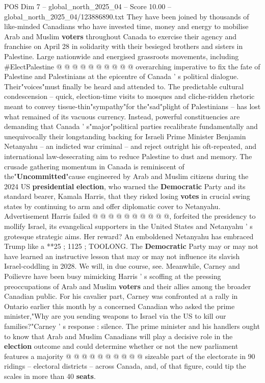 \begin{textsample}{POS Dim 7 – global\_north\_2025\_04 – Score 10.00 – global\_north\_2025\_04/123886890.txt}
They have been joined by thousands of like-minded Canadians who have invested time, money and energy to mobilise Arab and Muslim \textbf{voters} throughout Canada to exercise their agency and franchise on April 28 in solidarity with their besieged brothers and sisters in Palestine.
Large nationwide and energised grassroots movements, including \#ElectPalestine @ @ @ @ @ @ @ @ @ @ overarching imperative to fix the fate of Palestine and Palestinians at the epicentre of Canada ' s political dialogue.
Their"voices"must finally be heard and attended to.
The predictable cultural condescension -- quick, election-time visits to mosques and cliche-ridden rhetoric meant to convey tissue-thin"sympathy"for the"sad"plight of Palestinians -- has lost what remained of its vacuous currency.
Instead, powerful constituencies are demanding that Canada ' s"major"political parties recalibrate fundamentally and unequivocally their longstanding backing for Israeli Prime Minister Benjamin Netanyahu -- an indicted war criminal -- and reject outright his oft-repeated, and international law-desecrating aim to reduce Palestine to dust and memory.
The crusade gathering momentum in Canada is reminiscent of the"\textbf{Uncommitted}"cause engineered by Arab and Muslim citizens during the 2024 US \textbf{presidential} \textbf{election}, who warned the \textbf{Democratic} Party and its standard bearer, Kamala Harris, that they risked losing \textbf{votes} in crucial swing states by continuing to arm and offer diplomatic cover to Netanyahu.
Advertisement Harris failed @ @ @ @ @ @ @ @ @ @, forfeited the presidency to mollify Israel, its evangelical supporters in the United States and Netanyahu ' s grotesque strategic aims.
Her reward?
An emboldened Netanyahu has embraced Trump like a **25 ; 1125 ; TOOLONG.
The \textbf{Democratic} Party may or may not have learned an instructive lesson that may or may not influence its slavish Israel-coddling in 2028.
We will, in due course, see.
Meanwhile, Carney and Poilievre have been busy mimicking Harris ' s scoffing at the pressing preoccupations of Arab and Muslim \textbf{voters} and their allies among the broader Canadian public.
For his cavalier part, Carney was confronted at a rally in Ontario earlier this month by a concerned Canadian who asked the prime minister,"Why are you sending weapons to Israel via the US to kill our families?"Carney ' s response : silence.
The prime minister and his handlers ought to know that Arab and Muslim Canadians will play a decisive role in the \textbf{election} outcome and could determine whether or not the new parliament features a majority @ @ @ @ @ @ @ @ @ @ sizeable part of the electorate in 90 ridings -- electoral districts -- across Canada, and, of that figure, could tip the scales in more than 40 \textbf{seats}.

\end{textsample}
